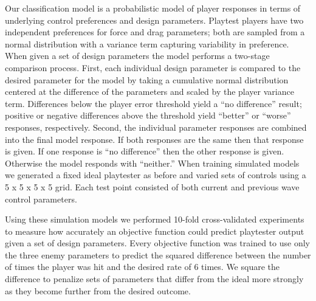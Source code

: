 \documentclass{sig-alternate}
\begin{document}
Our classification model is a probabilistic model of player responses in terms of underlying control preferences and design parameters.
Playtest players have two independent preferences for force and drag parameters; both are sampled from a normal distribution with a variance term capturing variability in preference.
When given a set of design parameters the model performs a two-stage comparison process.
First, each individual design parameter is compared to the desired parameter for the model by taking a cumulative normal distribution centered at the difference of the parameters and scaled by the player variance term.
Differences below the player error threshold yield a ``no difference'' result; positive or negative differences above the threshold yield ``better'' or ``worse'' responses, respectively.
Second, the individual parameter responses are combined into the final model response.
If both responses are the same then that response is given.
If one response is ``no difference'' then the other response is given.
Otherwise the model responds with ``neither.''
When training simulated models we generated a fixed ideal playtester as before and varied sets of controls using a 5 x 5 x 5 x 5 grid.
Each test point consisted of both current and previous wave control parameters.



Using these simulation models we performed 10-fold cross-validated experiments to measure how accurately an objective function could predict playtester output given a set of design parameters.
Every objective function was trained to use only the three enemy parameters to predict the squared difference between the number of times the player was hit and the desired rate of 6 times.
We square the difference to penalize sets of parameters that differ from the ideal more strongly as they become further from the desired outcome.
\end{document}
